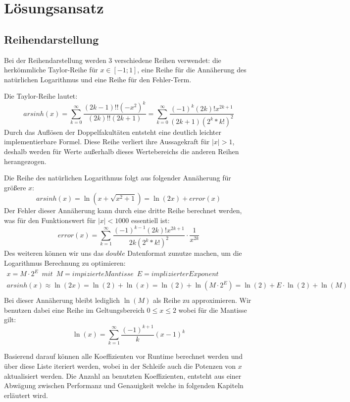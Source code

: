\documentclass[course=erap] {aspdoc}
\begin{document}
    \section{Lösungsansatz}

    \subsection{Reihendarstellung}
    Bei der Reihendarstellung werden 3 verschiedene Reihen verwendet: die herkömmliche Taylor-Reihe für $x\in[-1;1]$,
    eine Reihe für die Annäherung des natürlichen Logarithmus und eine Reihe für den Fehler-Term.

    Die Taylor-Reihe lautet:
    \[
        arsinh(x) = \sum_{k = 0}^{\infty} \frac{(2k-1)!!(-x^2)^k}{(2k)!!(2k + 1)}
        = \sum_{k = 0}^{\infty} \frac{(-1)^k(2k)!x^{2k + 1}}{(2k + 1)(2^k*k!)^2}

    \]
    Durch das Auflösen der Doppelfakultäten entsteht eine deutlich leichter implementierbare Formel.
    Diese Reihe verliert ihre Aussagekraft für $|x| > 1$, deshalb werden für Werte außerhalb dieses Wertebereichs die anderen Reihen herangezogen.


    Die Reihe des natürlichen Logarithmus folgt aus folgender Annäherung für größere $x$:
    \[
        arsinh(x) = \ln(x + \sqrt{x^2 + 1}) = \ln(2x) + error(x)
    \]
    Der Fehler dieser Annäherung kann durch eine dritte Reihe berechnet werden, was für den Funktionswert für $|x| < 1000$ essentiell ist:
    \[
        error(x) =  \sum_{k = 1}^{\infty} \frac{(-1)^{k - 1}(2k)!x^{2k + 1}}{2k(2^k*k!)^2} \cdot \frac{1}{x^{2k}}
    \]
    Des weiteren können wir uns das $double$ Datenformat zunutze machen, um die Logarithmus Berechnung zu optimieren:
    \begin{gather*}
        x = M\cdot2^E \,\,\, mit \,\,\, M = impizierte Mantisse \,\,\, E = implizierter Exponent\\
        arsinh(x) \approx \ln(2x) = \ln(2) + \ln(x) = \ln(2) + \ln(M\cdot2^E) = \ln(2) + E\cdot\ln(2) + \ln(M)\\
    \end{gather*}
    Bei dieser Annäherung bleibt lediglich $\ln(M)$ als Reihe zu approximieren.
    Wir benutzen dabei eine Reihe im Geltungsbereich $0 \leq x \leq 2$ wobei für die Mantisse gilt:
    \[
        \ln(x) = \sum_{k = 1}^{\infty} \frac{(-1)^{k + 1}}{k}(x - 1)^k
    \]

    Basierend darauf können alle Koeffizienten vor Runtime berechnet werden und über diese Liste iteriert werden, wobei in der Schleife auch die Potenzen von $x$ aktualisiert werden.
    Die Anzahl an benutzten Koeffizienten, entsteht aus einer Abwägung zwischen Performanz und Genauigkeit welche in folgenden Kapiteln erläutert wird.
\end{document}
